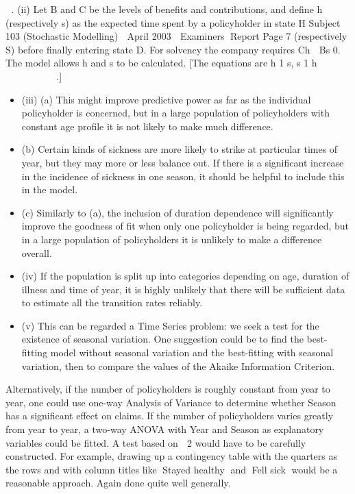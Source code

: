 \documentclass[a4paper,12pt]{article}
\begin{document}
 
.
(ii) Let B and C be the levels of benefits and contributions, and define h
(respectively s) as the expected time spent by a policyholder in state H
Subject 103 (Stochastic Modelling)  April 2003  Examiners Report
Page 7
(respectively S) before finally entering state D. For solvency the company
requires Ch  Bs 
 0.
The model allows h and s to be calculated. [The equations are
h 1 s, s 1 h  
   
   
.]
\begin{itemize}
\item (iii) (a) This might improve predictive power as far as the individual policyholder is concerned, but in a large population of policyholders with constant age profile it is not likely to make much difference.
\item (b) Certain kinds of sickness are more likely to strike at particular times of year, but they may more or less balance out. If there is a significant
increase in the incidence of sickness in one season, it should be helpful to include this in the model.
\item (c) Similarly to (a), the inclusion of duration dependence will significantly
improve the goodness of fit when only one policyholder is being
regarded, but in a large population of policyholders it is unlikely to
make a difference overall.
\item (iv) If the population is split up into categories depending on age, duration of illness and time of year, it is highly unlikely that there will be sufficient data to estimate all the transition rates reliably.
\item (v) This can be regarded a Time Series problem: we seek a test for the existence of seasonal variation. One suggestion could be to find the best-fitting model without seasonal variation and the best-fitting with seasonal variation, then to compare the values of the Akaike Information Criterion.
\end{itemize}
Alternatively, if the number of policyholders is roughly constant from year to year, one could use one-way Analysis of Variance to determine whether Season has a significant effect on claims. If the number of policyholders varies greatly from year to year, a two-way ANOVA with Year and Season as explanatory variables could be fitted.
A test based on 
2 would have to be carefully constructed. For example,
drawing up a contingency table with the quarters as the rows and with column
titles like Stayed healthy and Fell sick would be a reasonable approach.
Again done quite well generally.


\end{document}
